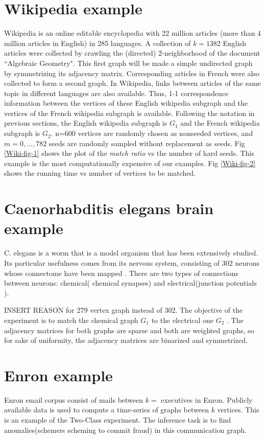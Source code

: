 \documentclass[12pt]{article}
\begin{document}
\section{Wikipedia example \label{wiki}}
Wikipedia is an online editable encyclopedia with 22 million articles (more than 4 million articles in English) in 285 languages. A collection of $k=1382$ English articles were collected by crawling the (directed) 2-neighborhood of the document ``Algebraic Geometry". This first graph will be made a simple undirected graph by symmetrizing its adjacency matrix. Corresponding articles in French  were also collected to form a second graph.  In Wikipedia, links between articles of the same topic  in different languages are also available.  Thus, 1-1 correspondence information between the vertices of these English wikipedia subgraph and the vertices of the French wikipedia subgraph is available. Following the notation in previous sections, the English wikipedia subgraph is $G_1$ and the  French  wikipedia subgraph is $G_2$. n=600 vertices are randomly chosen as nonseeded vertices, and $m=0,\ldots, 782$ seeds are randomly sampled without replacement as seeds. Fig \ref{Wiki-fig-1} shows the plot of the \emph{match ratio} vs the number of hard seeds.
This example is the most computationally expensive of our examples. Fig \ref{Wiki-fig-2} shows the running time vs number of vertices to be matched.

\section{Caenorhabditis elegans brain example \label{celegans}}
C. elegans is a worm that is a model organism that has been extensively studied. Its  particular usefulness comes from its nervous system, consisting of 302 neurons whose connectome have been  mapped \cite{}. There are two types  of  connections between neurons: chemical( chemical synapses) and electrical(junction potentials ). 

INSERT REASON for 279 vertex graph instead of 302.
The objective of the experiment is to match the chemical graph $G_1$ to  the electrical one $G_2$ .  The adjacency matrices for both graphs are sparse and both are weighted graphs, so for sake of uniformity, the adjacency matrices are binarized and symmetrized.

\section{Enron example \label{enron}}
Enron email corpus consist of mails between $k=$ executives in Enron. Publicly available data is used to compute a time-series of graphs between $k$ vertices. This is an example of the Two-Class experiment. The inference task is to find anomalies(schemers scheming to commit fraud) in this communication graph.    
\end{document}
